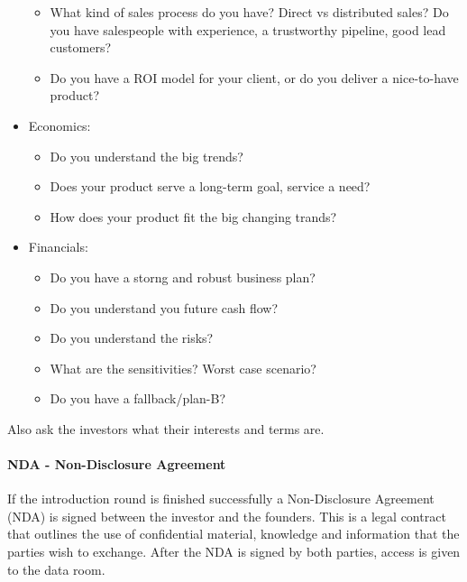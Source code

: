 \begin{itemize}
\begin{itemize}
            \item What kind of sales process do you have? Direct vs distributed sales?
                Do you have salespeople with experience, a trustworthy pipeline, good lead customers?
            \item Do you have a ROI model for your client, or do you deliver a nice-to-have product?
        \end{itemize}
    \item Economics:
        \begin{itemize}
            \item Do you understand the big trends?
            \item Does your product serve a long-term goal, service a need?
            \item How does your product fit the big changing trands?
        \end{itemize}
    \item Financials:
        \begin{itemize}
            \item Do you have a storng and robust business plan?
            \item Do you understand you future cash flow?
            \item Do you understand the risks?
            \item What are the sensitivities? Worst case scenario?
            \item Do you have a fallback/plan-B?
        \end{itemize}
\end{itemize}


Also ask the investors what their interests and terms are.

\paragraph{NDA - Non-Disclosure Agreement}

If the introduction round is finished successfully a Non-Disclosure Agreement (NDA)
is signed between the investor and the founders. This is a legal contract that outlines
the use of confidential material, knowledge and information that the parties wish
to exchange. After the NDA is signed by both parties, access is given to the data
room.

